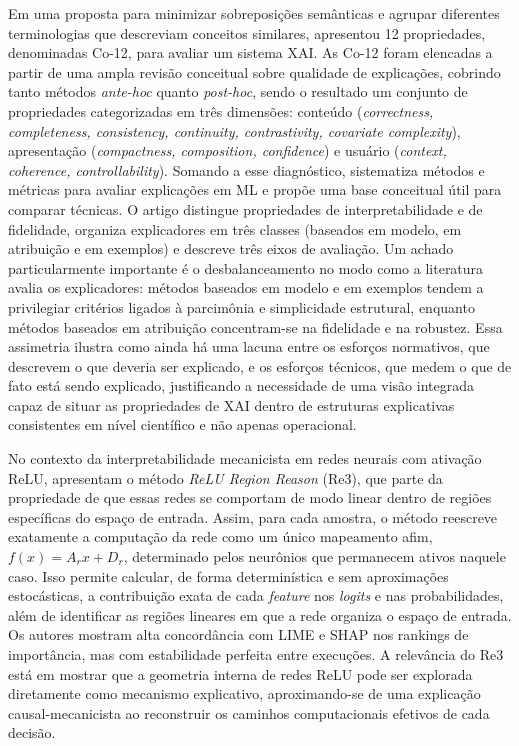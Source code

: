 Em uma proposta para minimizar sobreposições semânticas e agrupar diferentes terminologias que descreviam conceitos similares, \cite{Nauta2023} apresentou 12 propriedades, denominadas Co-12, para avaliar um sistema XAI. As Co-12 foram elencadas a partir de uma ampla revisão conceitual sobre qualidade de explicações, cobrindo tanto métodos \textit{ante-hoc} quanto \textit{post-hoc}, sendo o resultado um conjunto de propriedades categorizadas em três dimensões: conteúdo (\textit{correctness, completeness, consistency, continuity, contrastivity, covariate complexity}), apresentação (\textit{compactness, composition, confidence}) e usuário (\textit{context, coherence, controllability}). Somando a esse diagnóstico, \cite{Zhou2021} sistematiza métodos e métricas para avaliar explicações em ML e propõe uma base conceitual útil para comparar técnicas. O artigo distingue propriedades de interpretabilidade e de fidelidade, organiza explicadores em três classes (baseados em modelo, em atribuição e em exemplos) e descreve três eixos de avaliação. Um achado particularmente importante é o desbalanceamento no modo como a literatura avalia os explicadores: métodos baseados em modelo e em exemplos tendem a privilegiar critérios ligados à parcimônia e simplicidade estrutural, enquanto métodos baseados em atribuição concentram-se na fidelidade e na robustez. Essa assimetria ilustra como ainda há uma lacuna entre os esforços normativos, que descrevem o que deveria ser explicado, e os esforços técnicos, que medem o que de fato está sendo explicado, justificando a necessidade de uma visão integrada capaz de situar as propriedades de XAI dentro de estruturas explicativas consistentes em nível científico e não apenas operacional.

No contexto da interpretabilidade mecanicista em redes neurais com ativação ReLU, \cite{Barua2026} apresentam o método \textit{ReLU Region Reason} (Re3), que parte da propriedade de que essas redes se comportam de modo linear dentro de regiões específicas do espaço de entrada. Assim, para cada amostra, o método reescreve exatamente a computação da rede como um único mapeamento afim, \(f(x)=A_r x + D_r\), determinado pelos neurônios que permanecem ativos naquele caso. Isso permite calcular, de forma determinística e sem aproximações estocásticas, a contribuição exata de cada \textit{feature} nos \textit{logits} e nas probabilidades, além de identificar as regiões lineares em que a rede organiza o espaço de entrada. Os autores mostram alta concordância com LIME e SHAP nos rankings de importância, mas com estabilidade perfeita entre execuções. A relevância do Re3 está em mostrar que a geometria interna de redes ReLU pode ser explorada diretamente como mecanismo explicativo, aproximando-se de uma explicação causal-mecanicista ao reconstruir os caminhos computacionais efetivos de cada decisão.

